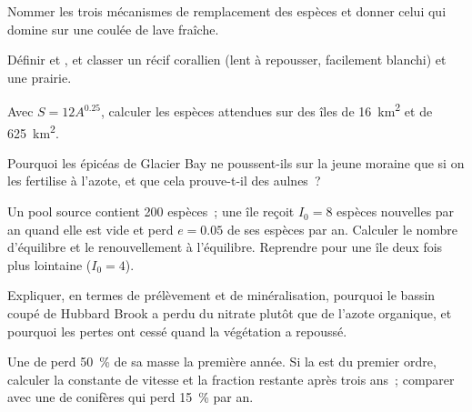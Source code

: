 \begin{exercise}[$\star$]\label{exo:b1:ecosystem-dynamics:2}
Nommer les trois mécanismes de remplacement des espèces et donner celui
qui domine sur une coulée de lave fraîche.
\end{exercise}

\begin{exercise}[$\star$]\label{exo:b1:ecosystem-dynamics:3}
Définir  et , et classer un récif corallien (lent à
repousser, facilement blanchi) et une prairie.
\end{exercise}

\begin{exercise}[$\star$]\label{exo:b1:ecosystem-dynamics:4}
Avec $S = 12 A^{0.25}$, calculer les espèces attendues sur des îles de
\qty{16}{km^2} et de \qty{625}{km^2}.
\end{exercise}

\begin{exercise}[$\star\star$]\label{exo:b1:ecosystem-dynamics:5}
Pourquoi les épicéas de Glacier Bay ne poussent-ils sur la jeune
moraine que si on les fertilise à l'azote, et que cela prouve-t-il des
aulnes~?
\end{exercise}

\begin{exercise}[$\star\star$]\label{exo:b1:ecosystem-dynamics:6}
Un pool source contient 200 espèces~; une île reçoit $I_0 = 8$ espèces
nouvelles par an quand elle est vide et perd $e = 0.05$ de ses espèces
par an. Calculer le nombre d'équilibre et le renouvellement à
l'équilibre. Reprendre pour une île deux fois plus lointaine ($I_0 = 4$).
\end{exercise}

\begin{exercise}[$\star\star$]\label{exo:b1:ecosystem-dynamics:7}
Expliquer, en termes de prélèvement et de minéralisation, pourquoi le
bassin coupé de Hubbard Brook a perdu du nitrate plutôt que de l'azote
organique, et pourquoi les pertes ont cessé quand la végétation a
repoussé.
\end{exercise}

\begin{exercise}[$\star\star$]\label{exo:b1:ecosystem-dynamics:8}
Une  de  perd \qty{50}{\%} de sa masse la première
année. Si la  est du premier ordre, calculer la constante
de vitesse et la fraction restante après trois ans~; comparer avec une
 de conifères qui perd \qty{15}{\%} par an.
\end{exercise}

